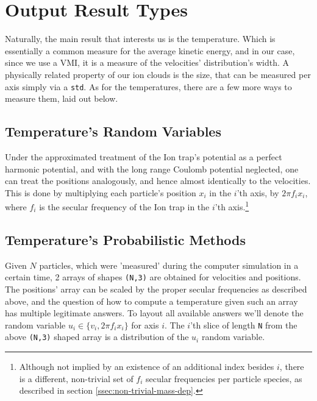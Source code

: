 
\section{Output Result Types}\label{sec:intro/-y-options}

Naturally, the main result that interests us is the temperature. Which is essentially a common measure for the average kinetic energy, and in our case, since we use a VMI, it is a measure of the velocities' distribution's width. A physically related property of our ion clouds is the size, that can be measured per axis simply via a \texttt{std}. As for the temperatures, there are a few more ways to measure them, laid out below. 

\subsection{Temperature's Random Variables}

Under the approximated treatment of the Ion trap's potential as a perfect harmonic potential, and with the long range Coulomb potential neglected, one can treat the positions analogously, and hence almost identically to the velocities. This is done by multiplying each particle's position $x_i$ in the $i$'th axis, by $2\pi f_i x_i$, where $f_i$ is the secular frequency of the Ion trap in the $i$'th axis.\footnote{Although not implied by an existence of an additional index besides $i$, there is a different, non-trivial set of $f_i$ secular frequencies per particle species, as described in section \ref{ssec:non-trivial-mass-dep}.}

\subsection{Temperature's Probabilistic Methods}\label{ssec:T_method}

Given $N$ particles, which were 'measured' during the computer simulation in a certain time, 2 arrays of shapes \texttt{(N,3)} are obtained for velocities and positions. The positions' array can be scaled by the proper secular frequencies as described above, and the question of how to compute a temperature given such an array has multiple legitimate answers. To layout all available answers we'll denote the random variable $u_i \in \{v_i, 2\pi f_i x_i\}$ for axis $i$. The $i$'th slice of length \texttt{N} from the above \texttt{(N,3)} shaped array is a distribution of the $u_i$ random variable.

